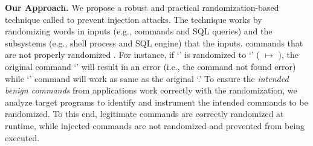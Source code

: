 \noindent
{\bf Our Approach.}
We propose a robust and practical randomization-based technique called \sysname to prevent  injection attacks.
The technique works by randomizing words in inputs (e.g., commands and SQL queries) and the subsystems  (e.g., shell process and SQL engine) that  the inputs.
 commands that are not properly randomized . For instance, if `' is randomized to `' ( $\mapsto$ ), the original command `' will result in an error (i.e., the command not found error) while `' command will work as same as the original `.'
To ensure the \emph{intended benign commands} from applications work correctly with the randomization, we analyze target programs to identify and instrument the intended commands to be randomized. 
To this end, legitimate commands are correctly randomized at runtime, while injected commands are not randomized and prevented from being executed.


